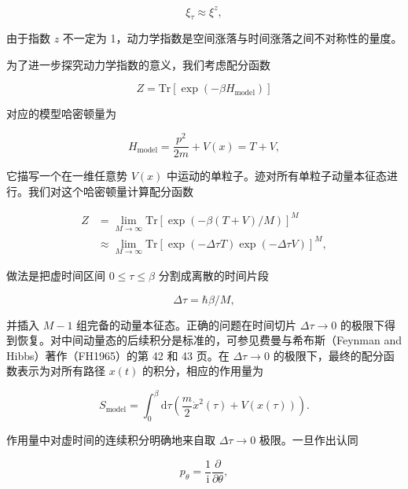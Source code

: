 \begin{equation*}
\xi_{\tau} \approx \xi^{z},\tag{14.4}
\end{equation*}

由于指数 $z$ 不一定为 1，动力学指数是空间涨落与时间涨落之间不对称性的量度。

为了进一步探究动力学指数的意义，我们考虑配分函数

\begin{equation*}
Z = \mathrm{Tr} \left[ \exp(-\beta H_{\mathrm{model}}) \right]\tag{14.5}
\end{equation*}

对应的模型哈密顿量为

\begin{equation*}
H_{\mathrm{model}} = \frac{p^2}{2m} + V(x) = T + V,\tag{14.6}
\end{equation*}

它描写一个在一维任意势 $V(x)$ 中运动的单粒子。迹对所有单粒子动量本征态进行。我们对这个哈密顿量计算配分函数

\begin{align*}
Z &= \lim_{M\to\infty} \mathrm{Tr} \left[ \exp(-\beta(T+V)/M) \right]^M \\
&\approx \lim_{M\to\infty} \mathrm{Tr} \left[ \exp(-\Delta\tau T) \exp(-\Delta\tau V) \right]^M,\tag{14.7}
\end{align*}

做法是把虚时间区间 $0\le\tau\le\beta$ 分割成离散的时间片段

\begin{equation*}
\Delta\tau = \hbar\beta/M,\tag{14.8}
\end{equation*}

并插入 $M-1$ 组完备的动量本征态。正确的问题在时间切片 $\Delta\tau\rightarrow 0$ 的极限下得到恢复。对中间动量态的后续积分是标准的，可参见费曼与希布斯（Feynman and Hibbs）著作（FH1965）的第 42 和 43 页。在 $\Delta\tau\rightarrow 0$ 的极限下，最终的配分函数表示为对所有路径 $x(t)$ 的积分，相应的作用量为

\begin{equation*}
S_{\mathrm{model}} = \int_0^{\beta} \mathrm{d}\tau \left( \frac{m}{2} \dot{x}^2(\tau) + V(x(\tau)) \right).\tag{14.9}
\end{equation*}

作用量中对虚时间的连续积分明确地来自取 $\Delta\tau\rightarrow 0$ 极限。一旦作出认同

\begin{equation*}
p_{\theta} = \frac{1}{\mathrm{i}} \frac{\partial}{\partial \theta},\tag{14.10}
\end{equation*}

